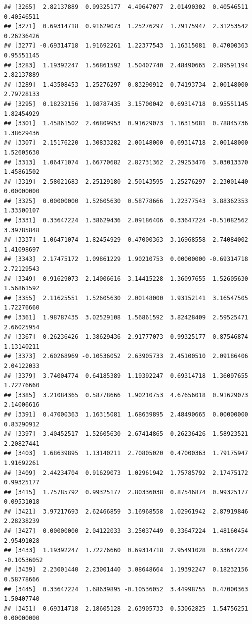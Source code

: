\documentclass[
]{article}
\begin{document}
\begin{verbatim}
## [3265]  2.82137889  0.99325177  4.49647077  2.01490302  0.40546511  0.40546511
## [3271]  0.69314718  0.91629073  1.25276297  1.79175947  2.31253542  0.26236426
## [3277] -0.69314718  1.91692261  1.22377543  1.16315081  0.47000363  0.95551145
## [3283]  1.19392247  1.56861592  1.50407740  2.48490665  2.89591194  2.82137889
## [3289]  1.43508453  1.25276297  0.83290912  0.74193734  2.00148000  2.79728133
## [3295]  0.18232156  1.98787435  3.15700042  0.69314718  0.95551145  1.82454929
## [3301]  1.45861502  2.46809953  0.91629073  1.16315081  0.78845736  1.38629436
## [3307]  2.15176220  1.30833282  2.00148000  0.69314718  2.00148000  1.52605630
## [3313]  1.06471074  1.66770682  2.82731362  2.29253476  3.03013370  1.45861502
## [3319]  2.58021683  2.25129180  2.50143595  1.25276297  2.23001440  0.00000000
## [3325]  0.00000000  1.52605630  0.58778666  1.22377543  3.88362353  1.33500107
## [3331]  0.33647224  1.38629436  2.09186406  0.33647224 -0.51082562  3.39785848
## [3337]  1.06471074  1.82454929  0.47000363  3.16968558  2.74084002  1.41098697
## [3343]  2.17475172  1.09861229  1.90210753  0.00000000 -0.69314718  2.72129543
## [3349]  0.91629073  2.14006616  3.14415228  1.36097655  1.52605630  1.56861592
## [3355]  2.11625551  1.52605630  2.00148000  1.93152141  3.16547505  1.72276660
## [3361]  1.98787435  3.02529108  1.56861592  3.82428409  2.59525471  2.66025954
## [3367]  0.26236426  1.38629436  2.91777073  0.99325177  0.87546874  1.13140211
## [3373]  2.60268969 -0.10536052  2.63905733  2.45100510  2.09186406  2.04122033
## [3379]  3.74004774  0.64185389  1.19392247  0.69314718  1.36097655  1.72276660
## [3385]  3.21084365  0.58778666  1.90210753  4.67656018  0.91629073  2.14006616
## [3391]  0.47000363  1.16315081  1.68639895  2.48490665  0.00000000  0.83290912
## [3397]  3.40452517  1.52605630  2.67414865  0.26236426  1.58923521  2.20827441
## [3403]  1.68639895  1.13140211  2.70805020  0.47000363  1.79175947  1.91692261
## [3409]  2.44234704  0.91629073  1.02961942  1.75785792  2.17475172  0.99325177
## [3415]  1.75785792  0.99325177  2.80336038  0.87546874  0.99325177  0.09531018
## [3421]  3.97217693  2.62466859  3.16968558  1.02961942  2.87919846  2.28238239
## [3427]  0.00000000  2.04122033  3.25037449  0.33647224  1.48160454  2.95491028
## [3433]  1.19392247  1.72276660  0.69314718  2.95491028  0.33647224 -0.10536052
## [3439]  2.23001440  2.23001440  3.08648664  1.19392247  0.18232156  0.58778666
## [3445]  0.33647224  1.68639895 -0.10536052  3.44998755  0.47000363  1.50407740
## [3451]  0.69314718  2.18605128  2.63905733  0.53062825  1.54756251  0.00000000

\end{verbatim}
\end{document}
